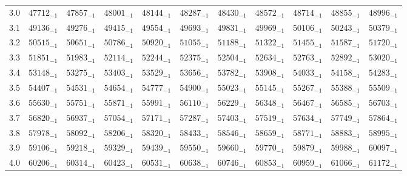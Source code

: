 \documentclass[10pt, a4paper]{article}
\begin{document}
\begin{center}
\begin{longtable}{c || c c c c c | c c c c c}
        3.0 & \({47712}_{-1}\) & \({47857}_{-1}\) & \({48001}_{-1}\) & \({48144}_{-1}\) & \({48287}_{-1}\) & \({48430}_{-1}\) & \({48572}_{-1}\) & \({48714}_{-1}\) & \({48855}_{-1}\) & \({48996}_{-1}\)\\
        3.1 & \({49136}_{-1}\) & \({49276}_{-1}\) & \({49415}_{-1}\) & \({49554}_{-1}\) & \({49693}_{-1}\) & \({49831}_{-1}\) & \({49969}_{-1}\) & \({50106}_{-1}\) & \({50243}_{-1}\) & \({50379}_{-1}\)\\
        3.2 & \({50515}_{-1}\) & \({50651}_{-1}\) & \({50786}_{-1}\) & \({50920}_{-1}\) & \({51055}_{-1}\) & \({51188}_{-1}\) & \({51322}_{-1}\) & \({51455}_{-1}\) & \({51587}_{-1}\) & \({51720}_{-1}\)\\
        3.3 & \({51851}_{-1}\) & \({51983}_{-1}\) & \({52114}_{-1}\) & \({52244}_{-1}\) & \({52375}_{-1}\) & \({52504}_{-1}\) & \({52634}_{-1}\) & \({52763}_{-1}\) & \({52892}_{-1}\) & \({53020}_{-1}\)\\
        3.4 & \({53148}_{-1}\) & \({53275}_{-1}\) & \({53403}_{-1}\) & \({53529}_{-1}\) & \({53656}_{-1}\) & \({53782}_{-1}\) & \({53908}_{-1}\) & \({54033}_{-1}\) & \({54158}_{-1}\) & \({54283}_{-1}\)\\
        3.5 & \({54407}_{-1}\) & \({54531}_{-1}\) & \({54654}_{-1}\) & \({54777}_{-1}\) & \({54900}_{-1}\) & \({55023}_{-1}\) & \({55145}_{-1}\) & \({55267}_{-1}\) & \({55388}_{-1}\) & \({55509}_{-1}\)\\
        3.6 & \({55630}_{-1}\) & \({55751}_{-1}\) & \({55871}_{-1}\) & \({55991}_{-1}\) & \({56110}_{-1}\) & \({56229}_{-1}\) & \({56348}_{-1}\) & \({56467}_{-1}\) & \({56585}_{-1}\) & \({56703}_{-1}\)\\
        3.7 & \({56820}_{-1}\) & \({56937}_{-1}\) & \({57054}_{-1}\) & \({57171}_{-1}\) & \({57287}_{-1}\) & \({57403}_{-1}\) & \({57519}_{-1}\) & \({57634}_{-1}\) & \({57749}_{-1}\) & \({57864}_{-1}\)\\
        3.8 & \({57978}_{-1}\) & \({58092}_{-1}\) & \({58206}_{-1}\) & \({58320}_{-1}\) & \({58433}_{-1}\) & \({58546}_{-1}\) & \({58659}_{-1}\) & \({58771}_{-1}\) & \({58883}_{-1}\) & \({58995}_{-1}\)\\
        3.9 & \({59106}_{-1}\) & \({59218}_{-1}\) & \({59329}_{-1}\) & \({59439}_{-1}\) & \({59550}_{-1}\) & \({59660}_{-1}\) & \({59770}_{-1}\) & \({59879}_{-1}\) & \({59988}_{-1}\) & \({60097}_{-1}\)\\
        4.0 & \({60206}_{-1}\) & \({60314}_{-1}\) & \({60423}_{-1}\) & \({60531}_{-1}\) & \({60638}_{-1}\) & \({60746}_{-1}\) & \({60853}_{-1}\) & \({60959}_{-1}\) & \({61066}_{-1}\) & \({61172}_{-1}\)\\

\end{longtable}
\end{center}
\end{document}
